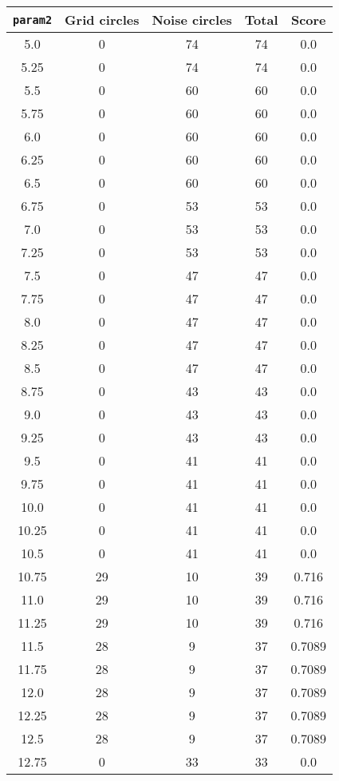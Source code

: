 \documentclass[letterpaper, 12pt]{article}
\begin{document}
\begin{longtable}{|c|c|c|c|c|}
\hline
\textbf{\texttt{param2}} & \textbf{Grid circles} & \textbf{Noise circles} & \textbf{Total} & \textbf{Score} \\
\hline
5.0 & 0 & 74 & 74 & 0.0 \\
\hline
5.25 & 0 & 74 & 74 & 0.0 \\
\hline
5.5 & 0 & 60 & 60 & 0.0 \\
\hline
5.75 & 0 & 60 & 60 & 0.0 \\
\hline
6.0 & 0 & 60 & 60 & 0.0 \\
\hline
6.25 & 0 & 60 & 60 & 0.0 \\
\hline
6.5 & 0 & 60 & 60 & 0.0 \\
\hline
6.75 & 0 & 53 & 53 & 0.0 \\
\hline
7.0 & 0 & 53 & 53 & 0.0 \\
\hline
7.25 & 0 & 53 & 53 & 0.0 \\
\hline
7.5 & 0 & 47 & 47 & 0.0 \\
\hline
7.75 & 0 & 47 & 47 & 0.0 \\
\hline
8.0 & 0 & 47 & 47 & 0.0 \\
\hline
8.25 & 0 & 47 & 47 & 0.0 \\
\hline
8.5 & 0 & 47 & 47 & 0.0 \\
\hline
8.75 & 0 & 43 & 43 & 0.0 \\
\hline
9.0 & 0 & 43 & 43 & 0.0 \\
\hline
9.25 & 0 & 43 & 43 & 0.0 \\
\hline
9.5 & 0 & 41 & 41 & 0.0 \\
\hline
9.75 & 0 & 41 & 41 & 0.0 \\
\hline
10.0 & 0 & 41 & 41 & 0.0 \\
\hline
10.25 & 0 & 41 & 41 & 0.0 \\
\hline
10.5 & 0 & 41 & 41 & 0.0 \\
\hline
10.75 & 29 & 10 & 39 & 0.716 \\
\hline
11.0 & 29 & 10 & 39 & 0.716 \\
\hline
11.25 & 29 & 10 & 39 & 0.716 \\
\hline
11.5 & 28 & 9 & 37 & 0.7089 \\
\hline
11.75 & 28 & 9 & 37 & 0.7089 \\
\hline
12.0 & 28 & 9 & 37 & 0.7089 \\
\hline
12.25 & 28 & 9 & 37 & 0.7089 \\
\hline
12.5 & 28 & 9 & 37 & 0.7089 \\
\hline
12.75 & 0 & 33 & 33 & 0.0 \\

\end{longtable}
\end{document}
